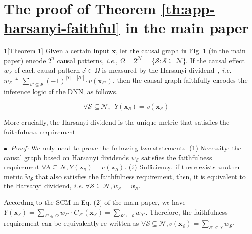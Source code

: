 \section{The proof of Theorem \ref{th:app-harsanyi-faithful} in the main paper}
\label{sec:app-proof-harsanyi-faithful}

\begin{manualtheorem}{1}[Theorem 1]\label{th:app-harsanyi-faithful}
Given a certain input {\small$\boldsymbol{x}$}, let the causal graph in Fig. 1 (in the main paper) encode {\small$2^n$} causal patterns, \emph{i.e.}, {\small$\Omega=2^{\mathcal{N}}=\{\mathcal{S}: \mathcal{S}\subseteq\mathcal{N}\}$}.
If the causal effect {\small$w_{\mathcal{S}}$} of each causal pattern {\small$\mathcal{S}\in\Omega$} is measured by the Harsanyi dividend~\cite{harsanyi1963simplified}, \emph{i.e.} {\small$w_{\mathcal{S}} \triangleq {\sum}_{\mathcal{S}'\subseteq \mathcal{S}}(-1)^{|\mathcal{S}|-|\mathcal{S}'|}\cdot v(\boldsymbol{x}_{\mathcal{S}'})$}, then the causal graph faithfully encodes the inference logic of the DNN, as follows.


\vspace{-5pt}
\begin{small}
\begin{equation}
    \forall \mathcal{S}\subseteq \mathcal{N},\ \ 
    Y(\boldsymbol{x}_{\mathcal{S}}) = v(\boldsymbol{x}_{\mathcal{S}})
\end{equation}
\end{small}
More crucially, the Harsanyi dividend is the unique metric that satisfies the faithfulness requirement.
\end{manualtheorem}

$\bullet$~\textit{Proof:} We only need to prove the following two statements. (1) Necessity: the causal graph based on Harsanyi dividends {\small$w_{\mathcal{S}}$} satisfies the faithfulness requirement {\small$\forall \mathcal{S}\subseteq \mathcal{N}, Y(\boldsymbol{x}_{\mathcal{S}})\!=\! v(\boldsymbol{x}_{\mathcal{S}})$}.
(2) Sufficiency: if there exists another metric {\small$\tilde{w}_{\mathcal{S}}$} that also satisfies the faithfulness requirement, then, it is equivalent to the Harsanyi dividend, \emph{i.e.} {\small$\forall \mathcal{S}\subseteq \mathcal{N}, \tilde{w}_{\mathcal{S}}=w_{\mathcal{S}}$}.

According to the SCM in Eq. (2) of the main paper, we have {\small$Y(\boldsymbol{x}_{\mathcal{S}})=\sum_{\mathcal{S}'\in\Omega}w_{\mathcal{S}'}\cdot C_{\mathcal{S}'}(\boldsymbol{x}_{\mathcal{S}})=\sum_{\mathcal{S}'\subseteq\mathcal{S}}w_{\mathcal{S}'}$}.
Therefore, the faithfulness requirement can be equivalently re-written as {\small$\forall \mathcal{S}\subseteq \mathcal{N}, v(\boldsymbol{x}_{\mathcal{S}})=\sum_{\mathcal{S}'\subseteq\mathcal{S}}w_{\mathcal{S}'}$}.

